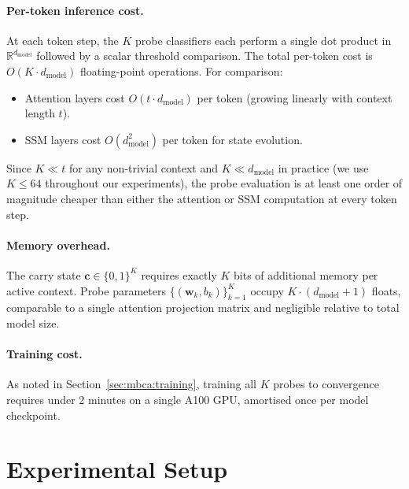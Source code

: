 \documentclass{article}
\newcommand{\MBCA}{\mathrm{MBCA}}
\begin{document}
\paragraph{Per-token inference cost.}
At each token step, the $K$ probe classifiers each perform a single dot product
in $\mathbb{R}^{d_{\mathrm{model}}}$ followed by a scalar threshold comparison.
The total per-token cost is $O(K \cdot d_{\mathrm{model}})$ floating-point
operations.  For comparison:
\begin{itemize}
  \item Attention layers cost $O(t \cdot d_{\mathrm{model}})$ per token (growing
        linearly with context length $t$).
  \item SSM layers cost $O(d_{\mathrm{model}}^2)$ per token for state evolution.
\end{itemize}
Since $K \ll t$ for any non-trivial context and $K \ll d_{\mathrm{model}}$ in
practice (we use $K \leq 64$ throughout our experiments), the \MBCA{} probe
evaluation is at least one order of magnitude cheaper than either the attention
or SSM computation at every token step.

\paragraph{Memory overhead.}
The carry state $\mathbf{c} \in \{0,1\}^K$ requires exactly $K$ bits of
additional memory per active context.  Probe parameters $\{(\mathbf{w}_k,
b_k)\}_{k=1}^K$ occupy $K \cdot (d_{\mathrm{model}} + 1)$ floats, comparable
to a single attention projection matrix and negligible relative to total model
size.

\paragraph{Training cost.}
As noted in Section~\ref{sec:mbca:training}, training all $K$ probes to
convergence requires under 2 minutes on a single A100 GPU, amortised once
per model checkpoint.


\section{Experimental Setup}
\label{sec:experimental-setup}
\end{document}
